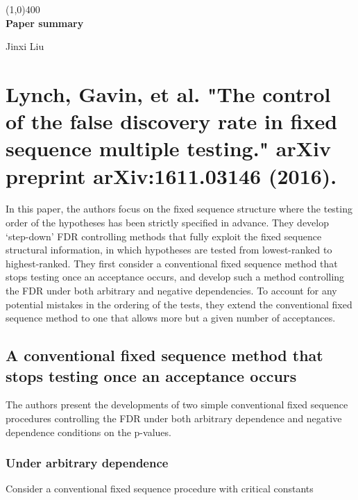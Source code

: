 \documentclass{article}
\begin{document}
	
	\begin{titlepage}
		\begin{center}
			\line(1,0){400}\\
			[3mm]
			\huge{\bfseries Paper summary}\\
			[3mm]
			
			
		\end{center}
		
		\begin{flushright}
			\LARGE{Jinxi Liu}
		\end{flushright}
		
	\end{titlepage}

\tableofcontents
\cleardoublepage

\section{Lynch, Gavin, et al. "The control of the false discovery rate in fixed sequence multiple testing." arXiv preprint arXiv:1611.03146 (2016).}
In this paper, the authors focus on the fixed sequence structure where the testing order of the hypotheses has been strictly specified in advance. They develop ‘step-down’ FDR controlling methods that fully exploit the fixed sequence structural information, in which hypotheses are tested from lowest-ranked
to highest-ranked. They first consider a conventional fixed sequence method that stops testing once an acceptance occurs, and develop such a method controlling the FDR under both arbitrary and negative dependencies. To account for any potential mistakes in the ordering of the tests, they extend the conventional fixed sequence method to one that allows more but a given number of acceptances.

\subsection{A conventional fixed sequence method that stops testing once an acceptance occurs}
The authors present the developments of two simple conventional fixed sequence procedures controlling the FDR under both arbitrary dependence and negative dependence conditions on the p-values.

\subsubsection{Under arbitrary dependence}
Consider a conventional fixed sequence procedure with critical constants
\end{document}
